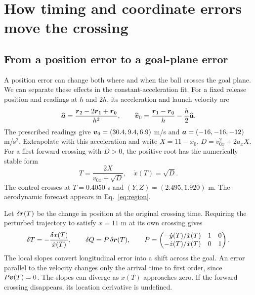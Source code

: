 \section{How timing and coordinate errors move the crossing}
\label{app:event}

\subsection{From a position error to a goal-plane error}
A position error can change both where and when the ball crosses the goal plane. We can separate these effects in the constant-acceleration fit. For a fixed release position and readings at \(h\) and \(2h\), its acceleration and launch velocity are
\begin{equation}
 \widehat{\boldsymbol{a}}=\frac{\boldsymbol{r}_2-2\boldsymbol{r}_1+\boldsymbol{r}_0}{h^2},
 \qquad
 \widehat{\boldsymbol{v}}_0=\frac{\boldsymbol{r}_1-\boldsymbol{r}_0}{h}
                         -\frac{h}{2}\widehat{\boldsymbol{a}}.
\end{equation}
The prescribed readings give \(\boldsymbol{v}_0=(30.4,9.4,6.9)\) m/s and \(\boldsymbol{a}=(-16,-16,-12)\) m/s\(^2\). Extrapolate with this acceleration and write \(X=11-x_0\), \(D=v_{0x}^2+2a_xX\). For a first forward crossing with \(D>0\), the positive root has the numerically stable form
\begin{equation}
 T=\frac{2X}{v_{0x}+\sqrt{D}},\quad
 \dot{x}(T)=\sqrt{D}.
\end{equation}
The control crosses at \(T=0.4050\) s and \((Y,Z)=(2.495,1.920)\) m. The aerodynamic forecast appears in Eq.~\eqref{eq:region}.

Let \(\delta\boldsymbol{r}(T)\) be the change in position at the original crossing time. Requiring the perturbed trajectory to satisfy \(x=11\) m at its own crossing gives
\begin{equation}
 \delta T=-\frac{\delta x(T)}{\dot{x}(T)},\qquad
 \delta Q=P\,\delta\boldsymbol{r}(T),\qquad
 P=\begin{pmatrix}
 -\dot y(T)/\dot x(T)&1&0\\
 -\dot z(T)/\dot x(T)&0&1
 \end{pmatrix}.
 \label{eq:event-project}
\end{equation}
The local slopes convert longitudinal error into a shift across the goal. An error parallel to the velocity changes only the arrival time to first order, since \(P\boldsymbol{v}(T)=0\). The slopes can diverge as \(\dot x(T)\) approaches zero. If the forward crossing disappears, its location derivative is undefined.


